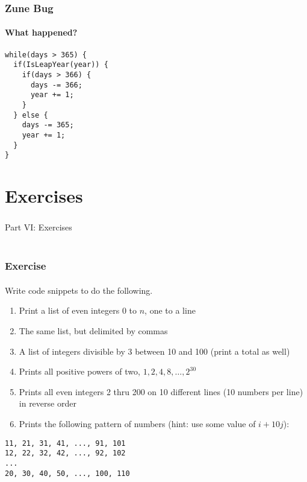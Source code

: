 \documentclass[]{beamer}
\begin{document}
\begin{frame}[fragile]
  \frametitle{Zune Bug}
  \framesubtitle{What happened?}

\begin{verbatim}
while(days > 365) {
  if(IsLeapYear(year)) {
    if(days > 366) {      
      days -= 366;
      year += 1;
    }
  } else {
    days -= 365;
    year += 1;
  }
}
\end{verbatim}

\end{frame}

 
\section{Exercises}

\begin{frame}
    \frametitle{}
    \framesubtitle{}
    
    \begin{center}
    {\Huge Part VI: Exercises}\\
    {\Large ~}
    \end{center}

\end{frame}

\begin{frame}[fragile]
  \frametitle{Exercise}
  \framesubtitle{}

Write code snippets to do the following.

\begin{enumerate}
  \item Print a list of even integers 0 to $n$, one to a line
  \item The same list, but delimited by commas
  \item A list of integers divisible by 3 between 10 and 100 (print a total as well)
  \item Prints all positive powers of two, $1, 2, 4, 8, \ldots, 2^{30}$
  \item Prints all even integers 2 thru 200 on 10 different lines 
    (10 numbers per line) in reverse order
  \item Prints the following pattern of numbers (hint: use some value of $i+10j$):
\end{enumerate}
\begin{verbatim}
11, 21, 31, 41, ..., 91, 101
12, 22, 32, 42, ..., 92, 102
...
20, 30, 40, 50, ..., 100, 110
\end{verbatim}
\end{frame}
\end{document}
